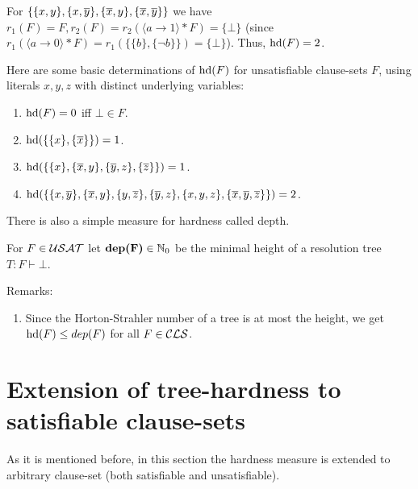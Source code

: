 \documentclass[12pt]{book}
\begin{document}
\begin{examp}\label{exp:hardness1}
      For $\{ \{ x,y \},\{ x,\overline{y} \},\{ \overline{x},y \},\{ \overline{x},\overline{y} \} \}$ we have $r_1(F)=F, r_2(F)=r_2( \langle a \rightarrow 1 \rangle * F) = \{ \bot \}$
	  (since $r_1( \langle a \rightarrow 0 \rangle * F)=r_1 (\{\{ b \}, \{ \neg b \}\}) = \{ \bot \}$). Thus, $\operatorname{hd}(F) = 2$.
\end{examp}

\begin{examp}\label{exp:harducls}
  Here are some basic determinations of $\operatorname{hd}(F)$ for unsatisfiable clause-sets $F$, using literals $x,y,z$ with distinct underlying variables:
  \begin{enumerate}
  \item $\operatorname{hd}(F) = 0$ iff $\bot \in F$.
  \item $\operatorname{hd}(\{ \{ x \},\{ \overline{x} \} \}) = 1$.
  \item $\operatorname{hd}(\{ \{ x \},\{ \overline{x},y \}, \{ \overline{y},z \}, \{ \overline{z} \} \}) = 1$.
  \item $\operatorname{hd}(\{ \{ x,\overline{y} \},\{ \overline{x},y \},\{ y,\overline{z} \},\{ \overline{y},z \},\{ x,y,z \},\{ \overline{x},\overline{y},\overline{z} \} \}) = 2$.
  \end{enumerate}
\end{examp}
There is also a simple measure for hardness called depth.
\begin{defi}\label{def:hardness2}
      \cite{h5} For $F \in \mathcal{USAT}$ let $\textbf{dep(F)} \in \mathbb{N}_0$ be the minimal height of a resolution tree $T : F \vdash \bot$.
\end{defi}

Remarks:
\begin{enumerate}
  \item Since the Horton-Strahler number of a tree is at most the height, we get $\operatorname{hd}(F) \leq dep(F)$ for all $F \in \mathcal{CLS}$.
\end{enumerate}
\section{Extension of tree-hardness to satisfiable clause-sets}
\label{sec:extension_Hardness}

As it is mentioned before, in this section the hardness measure is extended to arbitrary clause-set (both satisfiable and unsatisfiable). 
\end{document}
